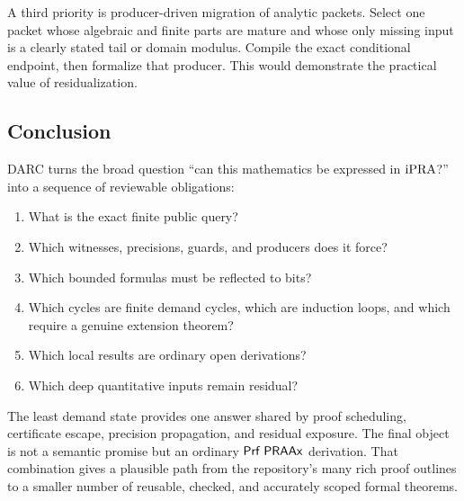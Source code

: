 A third priority is producer-driven migration of analytic packets.  Select one
packet whose algebraic and finite parts are mature and whose only missing input
is a clearly stated tail or domain modulus.  Compile the exact conditional
endpoint, then formalize that producer.  This would demonstrate the practical
value of residualization.

\subsection{Conclusion}

DARC turns the broad question ``can this mathematics be expressed in
\(\mathrm{iPRA}\)?'' into a sequence of reviewable obligations:
\begin{enumerate}
  \item What is the exact finite public query?
  \item Which witnesses, precisions, guards, and producers does it force?
  \item Which bounded formulas must be reflected to bits?
  \item Which cycles are finite demand cycles, which are induction loops, and
        which require a genuine extension theorem?
  \item Which local results are ordinary open derivations?
  \item Which deep quantitative inputs remain residual?
\end{enumerate}
The least demand state provides one answer shared by proof scheduling,
certificate escape, precision propagation, and residual exposure.  The final
object is not a semantic promise but an ordinary \(\mathsf{Prf}\;\mathsf{PRAAx}\) derivation.
That combination gives a plausible path from the repository's many rich proof
outlines to a smaller number of reusable, checked, and accurately scoped
formal theorems.
